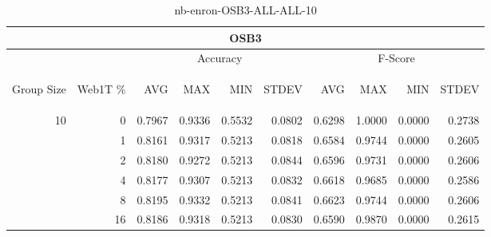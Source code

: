 \begin{center}
\begin{table}[htbp]
\begin{tabular}{ | r | r | r | r | r | r | r | r | r | r |}
\hline
\multicolumn{10}{|c|}{OSB3}\\
\hline
 & & \multicolumn{4}{|c|}{Accuracy} & \multicolumn{4}{|c|}{F-Score}\\ \cline{3-10}
\begin{sideways}Group Size\end{sideways} & \begin{sideways}Web1T \%\end{sideways} & \begin{sideways}AVG\end{sideways} & \begin{sideways}MAX\end{sideways} & \begin{sideways}MIN\end{sideways} & \begin{sideways}STDEV\end{sideways} & \begin{sideways}AVG\end{sideways} & \begin{sideways}MAX\end{sideways} & \begin{sideways}MIN\end{sideways} & \begin{sideways}STDEV\end{sideways}\\
\hline
\multirow{5}{*}{10}
 & 0 & 0.7967 & 0.9336 & 0.5532 & 0.0802 & 0.6298 & 1.0000 & 0.0000 & 0.2738\\ \cline{2-10}
 & 1 & 0.8161 & 0.9317 & 0.5213 & 0.0818 & 0.6584 & 0.9744 & 0.0000 & 0.2605\\ \cline{2-10}
 & 2 & 0.8180 & 0.9272 & 0.5213 & 0.0844 & 0.6596 & 0.9731 & 0.0000 & 0.2606\\ \cline{2-10}
 & 4 & 0.8177 & 0.9307 & 0.5213 & 0.0832 & 0.6618 & 0.9685 & 0.0000 & 0.2586\\ \cline{2-10}
 & 8 & 0.8195 & 0.9332 & 0.5213 & 0.0841 & 0.6623 & 0.9744 & 0.0000 & 0.2606\\ \cline{2-10}
 & 16 & 0.8186 & 0.9318 & 0.5213 & 0.0830 & 0.6590 & 0.9870 & 0.0000 & 0.2615\\ \cline{2-10}
\hline
\end{tabular}
\caption{nb-enron-OSB3-ALL-ALL-10}
\label{table:nb-enron-OSB3-ALL-ALL-10}
\end{table}
\end{center}

